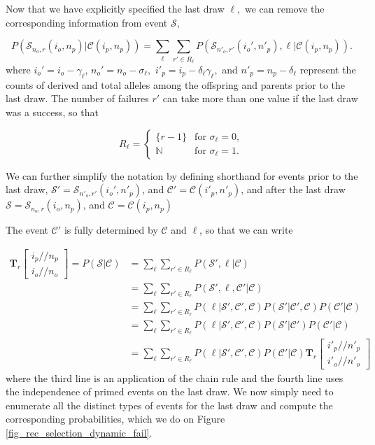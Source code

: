 \documentclass[review]{elsarticle}
\newcommand{\dslash}{/\!\!/}
\newcommand{\Coalc}[4]{\begin{bmatrix}#1\dslash #2 \\ #3\dslash #4 \end{bmatrix}}
\newcommand{\CC}{\mathcal{C}}
\newcommand{\ms}{\mathcal{S}}
\begin{document}
Now that we have explicitly specified the last draw $\ell,$ we can remove the corresponding
information from event $\ms,$ 

\begin{equation}
  P(\ms_{n_o,r}(i_o, n_p) | \CC{(i_p,n_p)} ) = \sum_\ell \sum_{r' \in R_\ell} P(\ms_{n'_o,r'}(i_o', n'_p),\ell | \CC{(i_p,n_p)} ) . 
\end{equation}
where $i_o' = i_o-\gamma_\ell$,  $n_o' = n_o-\sigma_\ell,$ $i'_p= i_p - \delta_\ell \gamma_\ell,$  and $n'_p  = n_p - \delta_\ell$ represent the 
counts of derived and total alleles among the offspring and parents prior to the last draw. 
 The number of failures $r'$ can take more than one value if the last draw was a success,
so that 

\begin{equation}
  R_\ell = \begin{cases} 
    \{r-1\}    & \text{for } \sigma_\ell = 0, \\
    \mathbb{N} & \text{for } \sigma_\ell = 1.
  \end{cases}
\end{equation} 

We can further simplify the notation by defining shorthand for events prior to the last draw,
 $\ms' = \ms_{n'_o,r'}(i_o', n'_p)$, and $\CC' = \CC{(i'_p,n'_p)}$, and after the
last draw $\ms = \ms_{n_o,r}(i_o, n_p)$, and $\CC = \CC{(i_p,n_p)}$

The event  $\CC'$ is fully determined by  $\CC$ and $\ell$, so that we can write

\begin{equation}
  \begin{split}
    \mathbf{T}_{r}\Coalc{i_p}{n_p}{i_o}{n_o} = P(\ms| \CC) &= \sum_\ell \sum_{r' \in R_\ell}
    P(\ms',\ell | \CC) \\ 
    &=\sum_\ell \sum_{r' \in R_\ell}P( \ms',\ell, \CC' |\CC) \\
    &=\sum_\ell \sum_{r' \in R_\ell}P(\ell | \ms', \CC', \CC ) P( \ms'| \CC', \CC)  P(\CC' |\CC) \\
    &=\sum_\ell \sum_{r' \in R_\ell}P(\ell | \ms', \CC', \CC ) P( \ms'| \CC')       P(\CC' |\CC) \\
    &=\sum_\ell \sum_{r' \in R_\ell}P(\ell | \ms', \CC', \CC ) P(\CC' |\CC)  \mathbf{T}_{r}\Coalc{i'_p}{n'_p}{i'_o}{n'_o}
  \end{split}
\end{equation}
where the third line is an application of the chain rule and the fourth line uses the independence
of primed events on the last draw.  We now simply need to enumerate all the distinct types of
events for the last draw and compute the corresponding probabilities, which we do on Figure
\ref{fig_rec_selection_dynamic_fail}.
\end{document}
